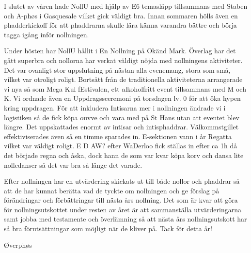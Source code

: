 \documentclass[../_main/handlingar.tex]{subfiles}
\begin{document}
\vspace{8px}

I slutet av våren hade NollU med hjälp av E6 temasläpp tillsammans med Staben och A-phøs i Gasquesale vilket gick väldigt bra. Innan sommaren hölls även en phadderkickoff för att phaddrarna skulle lära känna varandra bättre och börja tagga igång inför nollningen. 

Under hösten har NollU hållit i En Nollning på Okänd Mark. Överlag har det gått superbra och nollorna har verkat väldigt nöjda med nollningens aktiviteter. Det var ovanligt stor uppslutning på nästan alla evenemang, stora som små, vilket var otroligt roligt. Bortsätt från de traditionella aktiviteterna arrangerade vi nya så som Mega Kul fEstivalen, ett alkoholfritt event tillsammans med M och K. Vi ordnade även en Uppdragssceremoni på torsdagen lv. 0 för att öka hypen kring uppdragen. För att inkludera Intisarna mer i nollningen ändrade vi i logistiken så de fick köpa ouvve och vara med på St Hans utan att eventet blev längre. Det uppskattades enormt av intisar och intisphaddrar. Välkommstgillet effektiviserades även så en timme sparades in. E-sektionen vann i år Regatta vilket var väldigt roligt. E D AW? efter WaDerloo fick ställas in efter ca 1h då det började regna och åska, dock hann de som var kvar köpa korv och dansa lite nolledanser så det var bra så länge det varade.

Efter nollningen har en utvärdering skickats ut till både nollor och phaddrar så att de har kunnat berätta vad de tyckte om nollningen och ge förslag på förändringar och förbättringar till nästa års nollning. Det som är kvar att göra för nollningsutskottet under resten av året är att sammanställa utvärderingarna samt jobba med testamente och överlämning så att nästa års nollningsutskott har så bra förutsättningar som möjligt när de kliver på. Tack för detta år!


\begin{signatures}{1}
    \mvh
    \signature{Stephanie Bol}{Øverphøs}
\end{signatures}
\end{document}
